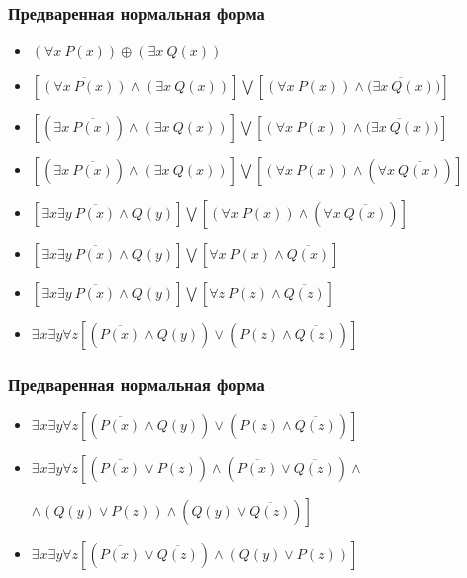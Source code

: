 \documentclass[24pt,pdf,hyperref={unicode},aspectratio=169]{beamer}
\begin{document}
\begin{frame}\frametitle{Предваренная нормальная форма}

\begin{itemize}
\item<+-> $(\forall x\ P(x))\oplus (\exists x\ Q(x))$
\item<+-> $\left[\overline{(\forall x\ P(x))}\wedge(\exists x\ Q(x))\right] \bigvee \left[(\forall x\ P(x))\wedge\overline{(\exists x\ Q(x)})\right]$
\item<+-> $\left[(\exists x\ \overline{P(x)})\wedge(\exists x\ Q(x))\right] \bigvee \left[(\forall x\ P(x))\wedge\overline{(\exists x\ Q(x)})\right]$
\item<+-> $\left[(\exists x\ \overline{P(x)})\wedge(\exists x\ Q(x))\right] \bigvee \left[(\forall x\ P(x))\wedge(\forall x\ \overline{Q(x)})\right]$
\item<+-> $\left[\exists x \exists y\ \overline{P(x)}\wedge Q(y)\right] \bigvee \left[(\forall x\ P(x))\wedge(\forall x\ \overline{Q(x)})\right]$
\item<+-> $\left[\exists x \exists y\ \overline{P(x)}\wedge Q(y)\right] \bigvee \left[\forall x\ P(x)\wedge\overline{Q(x)}\right]$
\item<+-> $\left[\exists x \exists y\ \overline{P(x)}\wedge Q(y)\right] \bigvee \left[\forall z\ P(z)\wedge\overline{Q(z)}\right]$
\item<+-> $\exists x \exists y \forall z \left[ (\overline{P(x)}\wedge Q(y)) \vee (P(z)\wedge\overline{Q(z)})\right]$
\end{itemize}
\end{frame}
\begin{frame}\frametitle{Предваренная нормальная форма}
\begin{itemize}
\item<+-> $\exists x \exists y \forall z \left[ (\overline{P(x)}\wedge Q(y)) \vee (P(z)\wedge\overline{Q(z)})\right]$

\item<+-> $\exists x \exists y \forall z \left[ (\overline{P(x)}\vee P(z))\wedge (\overline{P(x)}\vee \overline{Q(z)}) \wedge \right.$

\hspace{3cm} $ \left. \wedge (Q(y) \vee P(z)) \wedge (Q(y) \vee \overline{Q(z)}) \right] $

\item<+-> $\exists x \exists y \forall z \left[ (\overline{P(x)}\vee \overline{Q(z)}) \wedge (Q(y) \vee P(z))  \right]$

\end{itemize}
\end{frame}
\end{document}

